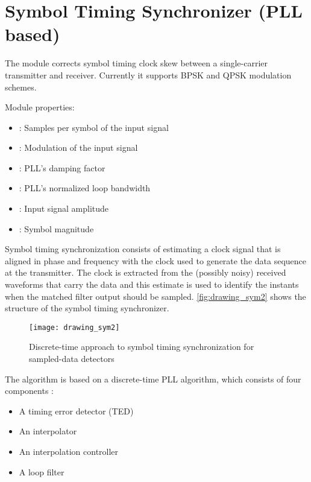 \section{Symbol Timing Synchronizer (PLL based)}

The  module corrects symbol timing clock skew between a single-carrier transmitter and receiver. Currently it supports BPSK and QPSK modulation schemes.

\noindent Module properties:
\begin{itemize}
  \item {}: Samples per symbol of the input signal
  \item {}: Modulation of the input signal
  \item {}: PLL's damping factor
  \item {}: PLL's normalized loop bandwidth
  \item {}: Input signal amplitude
  \item {}: Symbol magnitude
\end{itemize}

Symbol timing synchronization consists of estimating a clock signal that is aligned in phase and frequency with the clock used to generate the data sequence at the transmitter. The clock is extracted from the (possibly noisy) received waveforms that carry the data and this estimate is used to identify the instants when the matched filter output should be sampled. \autoref{fig:drawing_sym2} shows the structure of the symbol timing synchronizer.

\begin{figure}[H]
  \centering
  \texttt{[image: drawing\_sym2]}
  \caption{Discrete-time approach to symbol timing synchronization for sampled-data detectors}
  \label{fig:drawing_sym2}
\end{figure}

The algorithm is based on a discrete-time PLL algorithm, which consists of four components \cite{digcomm_discrete_approach}:
\begin{itemize}
  \item A timing error detector (TED)
  \item An interpolator
  \item An interpolation controller
  \item A loop filter
\end{itemize}

